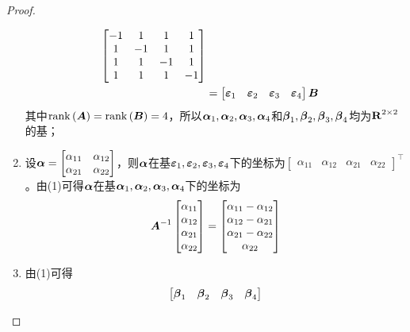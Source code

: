 \begin{proof}
\begin{enumerate}
{\begin{align*}
                  \begin{bmatrix}
                      -1 & 1  & 1  & 1  \\
                      1  & -1 & 1  & 1  \\
                      1  & 1  & -1 & 1  \\
                      1  & 1  & 1  & -1
                  \end{bmatrix}                                                                \\
                   & =\begin{bmatrix}\boldsymbol{\varepsilon}_1&\boldsymbol{\varepsilon}_2&\boldsymbol{\varepsilon}_3&\boldsymbol{\varepsilon}_4\end{bmatrix}\boldsymbol{B}
              \end{align*}
              其中\(\mathrm{rank}\left( \boldsymbol{A} \right)=\mathrm{rank}\left( \boldsymbol{B} \right)=4\)，所以\(\boldsymbol{\alpha}_1,\boldsymbol{\alpha}_2,\boldsymbol{\alpha}_3,\boldsymbol{\alpha}_4\)和\(\boldsymbol{\beta}_1,\boldsymbol{\beta}_2,\boldsymbol{\beta}_3,\boldsymbol{\beta}_4\)均为\(\boldsymbol{\mathrm{R}}^{2\times2}\)的基；
              }
        \item {
              设\(\boldsymbol{\alpha}=\begin{bmatrix}\alpha_{11}&\alpha_{12}\\\alpha_{21}&\alpha_{22}\end{bmatrix}\)，则\(\boldsymbol{\alpha}\)在基\(\boldsymbol{\varepsilon}_1,\boldsymbol{\varepsilon}_2,\boldsymbol{\varepsilon}_3,\boldsymbol{\varepsilon}_4\)下的坐标为\(\begin{bmatrix}\alpha_{11}&\alpha_{12}&\alpha_{21}&\alpha_{22}\end{bmatrix}^\top\)。由(1)可得\(\boldsymbol{\alpha}\)在基\(\boldsymbol{\alpha}_1,\boldsymbol{\alpha}_2,\boldsymbol{\alpha}_3,\boldsymbol{\alpha}_4\)下的坐标为
              \begin{equation*}
                  {\boldsymbol{A}}^{-1}\begin{bmatrix}\alpha_{11}\\\alpha_{12}\\\alpha_{21}\\\alpha_{22}\end{bmatrix}=
                  \begin{bmatrix}\alpha_{11}-\alpha_{12}\\\alpha_{12}-\alpha_{21}\\\alpha_{21}-\alpha_{22}\\\alpha_{22}\end{bmatrix}
              \end{equation*}
              }
        \item {
              由(1)可得
              \begin{align*}
                  \begin{bmatrix}\vecbeta_1&\vecbeta_2&\vecbeta_3&\vecbeta_4\end{bmatrix}

\end{align*}}
\end{enumerate}
\end{proof}
